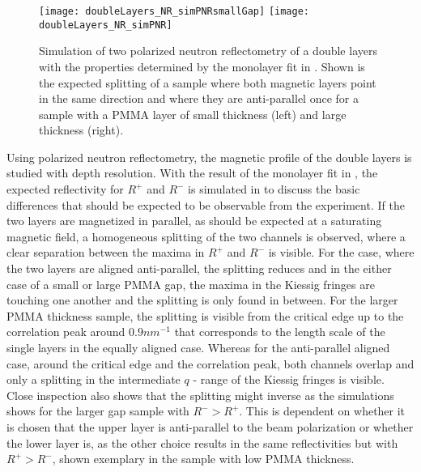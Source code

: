 \documentclass[\main/dresen_thesis.tex]{subfiles}
\begin{document}
  \label{sec:doubleLayers:pnr}
  
  \begin{figure}[tb]
    \centering
    \texttt{[image: doubleLayers\_NR\_simPNRsmallGap]}
    \texttt{[image: doubleLayers\_NR\_simPNR]}
    \caption{\label{fig:doubleLayers:pnrSimulation}Simulation of two polarized neutron reflectometry of a double layers with the properties determined by the monolayer fit in . Shown is the expected splitting of a sample where both magnetic layers point in the same direction and where they are anti-parallel once for a sample with a PMMA layer of small thickness (left) and large thickness (right).}
  \end{figure}

  Using polarized neutron reflectometry, the magnetic profile of the double layers is studied with depth resolution.
  With the result of the monolayer fit in , the expected reflectivity for $R^{+}$ and $R^{-}$ is simulated in  to discuss the basic differences that should be expected to be observable from the experiment.
  If the two layers are magnetized in parallel, as should be expected at a saturating magnetic field, a homogeneous splitting of the two channels is observed, where a clear separation between the maxima in $R^{+}$ and $R^{-}$ is visible.
  For the case, where the two layers are aligned anti-parallel, the splitting reduces and in the either case of a small or large PMMA gap, the maxima in the Kiessig fringes are touching one another and the splitting is only found in between.
  For the larger PMMA thickness sample, the splitting is visible from the critical edge up to the correlation peak around $0.9 \unit{nm^{-1}}$ that corresponds to the length scale of the single layers in the equally aligned case.
  Whereas for the anti-parallel aligned case, around the critical edge and the correlation peak, both channels overlap and only a splitting in the intermediate $q$ - range of the Kiessig fringes is visible.
  Close inspection also shows that the splitting might inverse as the simulations shows for the larger gap sample with $R^{-} > R^{+}$.
  This is dependent on whether it is chosen that the upper layer is anti-parallel to the beam polarization or whether the lower layer is, as the other choice results in the same reflectivities but with $R^{+} > R^{-}$, shown exemplary in the sample with low PMMA thickness.
  \\
\end{document}
